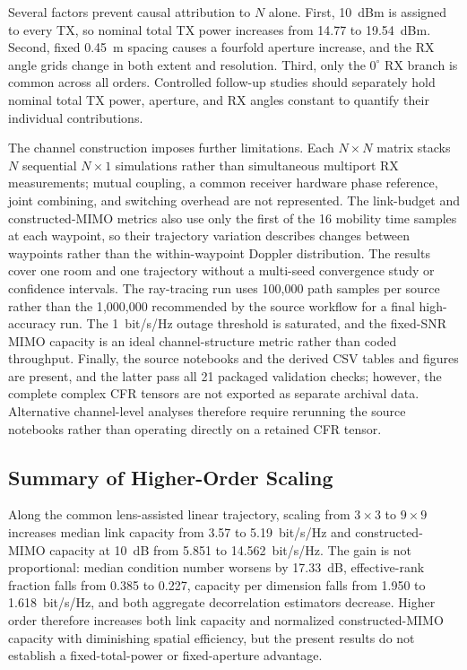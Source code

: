 Several factors prevent causal attribution to $N$ alone. First, 10~dBm is assigned to every TX, so nominal total TX power increases from 14.77 to 19.54~dBm. Second, fixed 0.45~m spacing causes a fourfold aperture increase, and the RX angle grids change in both extent and resolution. Third, only the $0^\circ$ RX branch is common across all orders. Controlled follow-up studies should separately hold nominal total TX power, aperture, and RX angles constant to quantify their individual contributions.

The channel construction imposes further limitations. Each $N\times N$ matrix stacks $N$ sequential $N\times1$ simulations rather than simultaneous multiport RX measurements; mutual coupling, a common receiver hardware phase reference, joint combining, and switching overhead are not represented. The link-budget and constructed-MIMO metrics also use only the first of the 16 mobility time samples at each waypoint, so their trajectory variation describes changes between waypoints rather than the within-waypoint Doppler distribution. The results cover one room and one trajectory without a multi-seed convergence study or confidence intervals. The ray-tracing run uses 100{,}000 path samples per source rather than the 1{,}000{,}000 recommended by the source workflow for a final high-accuracy run. The 1~bit/s/Hz outage threshold is saturated, and the fixed-SNR MIMO capacity is an ideal channel-structure metric rather than coded throughput. Finally, the source notebooks and the derived CSV tables and figures are present, and the latter pass all 21 packaged validation checks; however, the complete complex CFR tensors are not exported as separate archival data. Alternative channel-level analyses therefore require rerunning the source notebooks rather than operating directly on a retained CFR tensor.

\subsection{Summary of Higher-Order Scaling}

Along the common lens-assisted linear trajectory, scaling from $3\times3$ to $9\times9$ increases median link capacity from 3.57 to 5.19~bit/s/Hz and constructed-MIMO capacity at 10~dB from 5.851 to 14.562~bit/s/Hz. The gain is not proportional: median condition number worsens by 17.33~dB, effective-rank fraction falls from 0.385 to 0.227, capacity per dimension falls from 1.950 to 1.618~bit/s/Hz, and both aggregate decorrelation estimators decrease. Higher order therefore increases both link capacity and normalized constructed-MIMO capacity with diminishing spatial efficiency, but the present results do not establish a fixed-total-power or fixed-aperture advantage.

